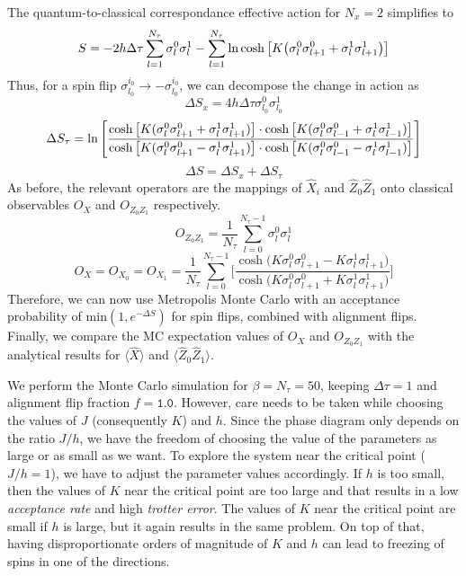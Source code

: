 \documentclass[../thesis_main.tex]{subfiles}
\begin{document}
The quantum-to-classical correspondance effective action for $N_x = 2$ simplifies to 
\[
    S = - 2h \Delta \tau \sum_{l=1}^{N_\tau} \sigma^{0}_l \sigma^{1}_{l} - \sum_{l=1}^{N_\tau} \ln \cosh \qty[K \qty(\sigma^0_l \sigma^0_{l+1} + \sigma^1_l \sigma^1_{l+1})] 
\]  
Thus, for a spin flip $\sigma^{i_0}_{l_0} \to - \sigma^{i_0}_{l_0}$, we can decompose the change in action as 
\[
    \Delta S_x = 4 h \Delta \tau \sigma^{0}_{l_0} \sigma^{1}_{l_0}  
\]
\[
    \Delta S_\tau = \ln \qty[ \frac{\cosh\qty[K(\sigma^{0}_{l} \sigma^{0}_{l+1} + \sigma^{1}_{l} \sigma^{1}_{l+1} )] \cdot \cosh\qty[K(\sigma^{0}_{l} \sigma^{0}_{l-1} + \sigma^{1}_{l} \sigma^{1}_{l-1} )] }{\cosh\qty[K(\sigma^{0}_{l} \sigma^{0}_{l+1} - \sigma^{1}_{l} \sigma^{1}_{l+1} )] \cdot \cosh\qty[K(\sigma^{0}_{l} \sigma^{0}_{l-1} - \sigma^{1}_{l} \sigma^{1}_{l-1} )]}  ]
\]
\[
    \Delta S = \Delta S_x + \Delta S_\tau 
\]
As before, the relevant operators are the mappings of $\hat{X}_i$ and $\hat{Z}_0 \hat{Z}_1$ onto classical observables $O_{X}$ and $O_{Z_0 Z_1}$ respectively.
\[
    O_{Z_0 Z_1} = \frac{1}{N_\tau} \sum_{l=0}^{N_\tau - 1} \sigma^0_l \sigma^1_l
\]
\[
    O_X = O_{X_0} = O_{X_1} = \frac{1}{N_\tau} \sum_{l=0}^{N_\tau -1} \Bigg[\frac{\cosh\big( K \sigma^0_l \sigma^0_{l+1} - K \sigma^1_l \sigma^1_{l+1} \big)}{\cosh\big( K \sigma^0_l \sigma^0_{l+1} + K \sigma^1_l \sigma^1_{l+1} \big)}  \Bigg]
\]
Therefore, we can now use Metropolis Monte Carlo with an acceptance probability of $\text{min} (1, e^{-\Delta S})$ for spin flips, combined with alignment flips. Finally, we compare the MC expectation values of $O_X$ and $O_{Z_0 Z_1}$ with the analytical results for $\langle \hat{X} \rangle$ and $\langle \hat{Z}_0 \hat{Z}_1\rangle$.

We perform the Monte Carlo simulation for $\beta = N_\tau = 50$, keeping $\Delta \tau = 1$ and alignment flip fraction $f = \texttt{1.0}$. However, care needs to be taken while choosing the values of $J$ (consequently $K$) and $h$. Since the phase diagram only depends on the ratio $J/h$, we have the freedom of choosing the value of the parameters as large or as small as we want. To explore the system near the critical point ($J/h = 1$), we have to adjust the parameter values accordingly. If $h$ is too small, then the values of $K$ near the critical point are too large and that results in a low \textit{acceptance rate} and high \textit{trotter error}. The values of $K$ near the critical point are small if $h$ is large, but it again results in the same problem. On top of that, having disproportionate orders of magnitude of $K$ and $h$ can lead to freezing of spins in one of the directions.
\end{document}

